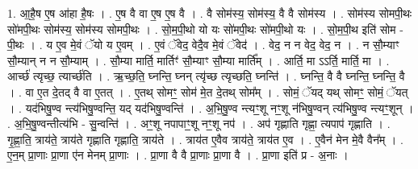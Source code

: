 \documentclass[17pt]{extarticle}
\begin{document}
1. आ॒है॒ष ए॒ष आ॑हा है॒षः । . ए॒ष वै वा ए॒ष ए॒ष वै । . वै सोम॑स्य॒ सोम॑स्य॒ वै वै सोम॑स्य । . सोम॑स्य सोमपी॒थः सो॑मपी॒थः सोम॑स्य॒ सोम॑स्य सोमपी॒थः । . सो॒म॒पी॒थो यो यः सो॑मपी॒थः सो॑मपी॒थो यः । . सो॒म॒पी॒थ इति॑ सोम - पी॒थः । . य ए॒व मे॒वं ॅयो य ए॒वम् । . ए॒वं ॅवेद॒ वेदै॒व मे॒वं ॅवेद॑ । . वेद॒ न न वेद॒ वेद॒ न । . न सौ॒म्याꣳ सौ॒म्यान् न न सौ॒म्याम् । . सौ॒म्या मार्ति॒ मार्तिꣳ॑ सौ॒म्याꣳ सौ॒म्या मार्ति᳚म् । . आर्ति॒ मा ऽऽर्ति॒ मार्ति॒ मा । . आर्च्छ॑ त्यृच्छ॒ त्यार्च्छ॑ति । . ऋ॒च्छ॒ति॒ घ्नन्ति॒ घ्नन् त्यृ॑च्छ त्यृच्छति॒ घ्नन्ति॑ । . घ्नन्ति॒ वै वै घ्नन्ति॒ घ्नन्ति॒ वै । . वा ए॒त दे॒तद् वै वा ए॒तत् । . ए॒तथ् सोमꣳ॒॒ सोम॑ मे॒त दे॒तथ् सोम᳚म् । . सोमं॒ ॅयद् यथ् सोमꣳ॒॒ सोमं॒ ॅयत् । . यद॑भिषु॒ण्व न्त्य॑भिषु॒ण्वन्ति॒ यद् यद॑भिषु॒ण्वन्ति॑ । . अ॒भि॒षु॒ण्व न्त्यꣳ॒॒शू नꣳ॒॒शू न॑भिषु॒ण्वन् त्य॑भिषु॒ण्व न्त्यꣳ॒॒शून् । . अ॒भि॒षु॒ण्वन्तीत्य॑भि - सु॒न्वन्ति॑ । . अꣳ॒॒शू नपापाꣳ॒॒शू नꣳ॒॒शू नप॑ । . अप॑ गृह्णाति गृह्णा॒ त्यपाप॑ गृह्णाति । . गृ॒ह्णा॒ति॒ त्राय॑ते॒ त्राय॑ते गृह्णाति गृह्णाति॒ त्राय॑ते । . त्राय॑त ए॒वैव त्राय॑ते॒ त्राय॑त ए॒व । . ए॒वैन॑ मेन मे॒वै वैन᳚म् । . ए॒न॒म् प्रा॒णाः प्रा॒णा ए॑न मेनम् प्रा॒णाः । . प्रा॒णा वै वै प्रा॒णाः प्रा॒णा वै । . प्रा॒णा इति॑ प्र - अ॒नाः । \newline
\end{document}
